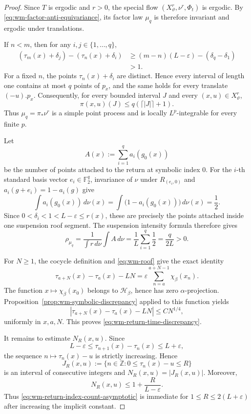 \documentclass[11pt,reqno,a4paper]{amsart}
\numberwithin{equation}{section}
\theoremstyle{compact}
\theoremstyle{definition}
\theoremstyle{definition}
\begin{document}
\begin{proof}
Since $T$ is ergodic and $r>0$, the special flow $(X_\vartheta^r,\nu^r,\Phi_t)$
is ergodic.  By \eqref{eq:wm-factor-anti-equivariance}, its factor law $\mu_q$
is therefore invariant and ergodic under translations.

If $n<m$, then for any
$i,j\in\{1,\ldots,q\}$,
\begin{align*}
 (\tau_m(x)+\delta_j)-(\tau_n(x)+\delta_i)
 &\geq (m-n)(L-\varepsilon)-(\delta_q-\delta_1)\\
 &>1.
\end{align*}
For a fixed $n$, the points $\tau_n(x)+\delta_i$ are distinct.  Hence every
interval of length one contains at most $q$ points of $p_x$, and the same
holds for every translate $(-u).p_x$.  Consequently, for every bounded interval $J$ and every
$(x,u)\in X_\vartheta^r$,
\[
  \pi(x,u)(J)\leq q(\lceil |J|\rceil+1).
\]
Thus $\mu_q=\pi_*\nu^r$ is a simple point process and is locally
$L^p$-integrable for every finite $p$.

Let
\[
  A(x):=\sum_{i=1}^q a_i(g_0(x))
\]
be the number of points attached to the return at symbolic index $0$.
For the $i$-th standard basis vector $e_i\in\mathbb F_2^q$, invariance of
$\nu$ under $R_{(e_i,0)}$ and
$a_i(g+e_i)=1-a_i(g)$ give
\[
  \int a_i(g_0(x))\,d\nu(x)
  =\int \bigl(1-a_i(g_0(x))\bigr)\,d\nu(x)
  =\frac12.
\]
Since $0<\delta_i<1<L-\varepsilon\leq r(x)$, these are precisely the points
attached inside one suspension roof segment.  The suspension intensity
formula therefore gives
\begin{equation}\label{eq:wm-intensity}
  \rho_{\mu_q}
  =\frac{1}{\int r\,d\nu}\int A\,d\nu
  =\frac1L\sum_{i=1}^q\frac12
  =\frac{q}{2L}>0.
\end{equation}

For $N\geq1$, the cocycle definition and \eqref{eq:wm-roof} give the exact
identity
\begin{equation}\label{eq:wm-return-time-beta-sum}
  \tau_{a+N}(x)-\tau_a(x)-LN
  =\varepsilon\sum_{n=a}^{a+N-1}\chi_\beta(x_n).
\end{equation}
The function $x\mapsto\chi_\beta(x_0)$ belongs to $\mathcal H_\beta$, hence
has zero $\alpha$-projection.  Proposition~\ref{prop:wm-symbolic-discrepancy}
applied to this function yields
\[
  \left|\tau_{a+N}(x)-\tau_a(x)-LN\right|
  \leq C N^{1/4},
\]
uniformly in $x,a,N$.  This proves
\eqref{eq:wm-return-time-discrepancy}.

It remains to estimate $N_R(x,u)$.  Since
\[
  L-\varepsilon
  \leq \tau_{n+1}(x)-\tau_n(x)
  \leq L+\varepsilon,
\]
the sequence $n\mapsto\tau_n(x)-u$ is strictly increasing.  Hence
\[
  J_R(x,u):=\{n\in\mathbb Z:0\leq\tau_n(x)-u\leq R\}
\]
is an interval of consecutive integers and
$N_R(x,u)=|J_R(x,u)|$.  Moreover,
\[
  N_R(x,u)
  \leq 1+\frac{R}{L-\varepsilon}.
\]
Thus \eqref{eq:wm-return-index-count-asymptotic} is immediate for
$1\leq R\leq2(L+\varepsilon)$ after increasing the implicit constant.


\end{proof}
\end{document}
